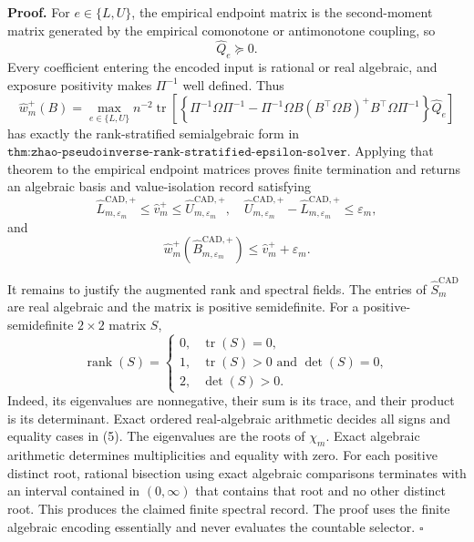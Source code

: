 \textbf{Proof.}
For \(e\in\{L,U\}\), the empirical endpoint matrix is the second-moment matrix generated by the empirical comonotone or antimonotone coupling, so
\[
\widehat Q_e\succeq0.
\tag{1}
\]
Every coefficient entering the encoded input is rational or real algebraic, and exposure positivity makes \(\Pi^{-1}\) well defined.  Thus
\[
\widehat w_m^+(B)=
\max_{e\in\{L,U\}}n^{-2}\operatorname{tr}\!\left[
\left\{\Pi^{-1}\Omega\Pi^{-1}
-\Pi^{-1}\Omega B(B^{\top}\Omega B)^+B^{\top}\Omega\Pi^{-1}\right\}
\widehat Q_e\right]
\tag{2}
\]
has exactly the rank-stratified semialgebraic form in \(\texttt{thm:zhao-pseudoinverse-rank-stratified-epsilon-solver}\).  Applying that theorem to the empirical endpoint matrices proves finite termination and returns an algebraic basis and value-isolation record satisfying
\[
\widehat L_{m,\varepsilon_m}^{\mathrm{CAD},+}
\le\widehat v_m^+
\le\widehat U_{m,\varepsilon_m}^{\mathrm{CAD},+},
\quad
\widehat U_{m,\varepsilon_m}^{\mathrm{CAD},+}
-\widehat L_{m,\varepsilon_m}^{\mathrm{CAD},+}
\le\varepsilon_m,
\tag{3}
\]
and
\[
\widehat w_m^+(\widehat B_{m,\varepsilon_m}^{\mathrm{CAD},+})
\le\widehat v_m^++\varepsilon_m.
\tag{4}
\]

It remains to justify the augmented rank and spectral fields.  The entries of \(\widehat S_m^{\mathrm{CAD}}\) are real algebraic and the matrix is positive semidefinite.  For a positive-semidefinite \(2\times2\) matrix \(S\),
\[
\operatorname{rank}(S)=
\begin{cases}
0,&\operatorname{tr}(S)=0,\\
1,&\operatorname{tr}(S)>0\text{ and }\det(S)=0,\\
2,&\det(S)>0.
\end{cases}
\tag{5}
\]
Indeed, its eigenvalues are nonnegative, their sum is its trace, and their product is its determinant.  Exact ordered real-algebraic arithmetic decides all signs and equality cases in (5).  The eigenvalues are the roots of \(\chi_m\).  Exact algebraic arithmetic determines multiplicities and equality with zero.  For each positive distinct root, rational bisection using exact algebraic comparisons terminates with an interval contained in \((0,\infty)\) that contains that root and no other distinct root.  This produces the claimed finite spectral record.  The proof uses the finite algebraic encoding essentially and never evaluates the countable selector. \(\square\)